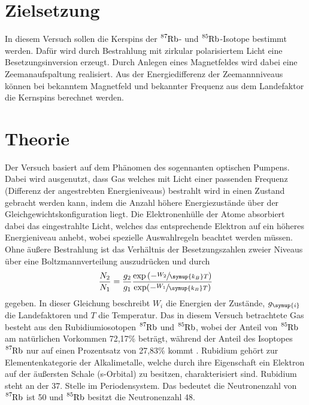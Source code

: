 \section{Zielsetzung}
\label{sec:Zielsetzung}
In diesem Versuch sollen die Kerspins der $\ce{^87Rb}$- und $\ce{^85Rb}$-Isotope
bestimmt werden. Dafür wird durch Bestrahlung mit zirkular polarisiertem Licht 
eine Besetzungsinversion erzeugt. Durch Anlegen eines Magnetfeldes wird dabei eine 
Zeemanaufspaltung realisiert. Aus der Energiedifferenz der Zeemannniveaus können bei 
bekanntem Magnetfeld und bekannter Frequenz aus dem Landefaktor die Kernspins
berechnet werden. 

\section{Theorie}
\label{sec:Theorie}

Der Versuch basiert auf dem Phänomen des sogennanten optischen Pumpens. 
Dabei wird ausgenutzt, dass Gas welches mit Licht einer passenden Frequenz 
(Differenz der angestrebten Energieniveaus) bestrahlt wird in einen Zustand 
gebracht werden kann, indem die Anzahl höhere Energiezustände über der 
Gleichgewichtskonfiguration liegt. Die Elektronenhülle der Atome 
absorbiert dabei das eingestrahlte Licht, welches das entsprechende Elektron 
auf ein höheres Energieniveau anhebt, wobei spezielle Auswahlregeln beachtet 
werden müssen.
Ohne äußere Bestrahlung ist das Verhältnis der Besetzungszahlen zweier Niveaus 
über eine Boltzmannverteilung auszudrücken und durch
\begin{equation}
    \frac{N_2}{N_1}=\frac{g_2}{g_1}\frac{\exp\left(-\sfrac{W_2}{\symup{k_B}T}\right)}{\exp(-\sfrac{W_1}{\symup{k_B}T})}
    \label{eq1}
\end{equation}
gegeben. In dieser Gleichung beschreibt $W_i$ die Energien der Zustände, 
$g_{\symup{i}}$ die Landefaktoren und $T$ die Temperatur.
Das in diesem Versuch betrachtete Gas besteht aus den Rubidiumiosotopen 
$\ce{^87Rb}$ und $\ce{^85Rb}$, wobei der Anteil von $\ce{^85Rb}$ am natürlichen 
Vorkommen 72,17\% beträgt, während der Anteil des Isoptopes $\ce{^87Rb}$
nur auf einen Prozentsatz  von 27,83\% kommt \cite{RbVorkommen}.
Rubidium gehört zur Elementenkategorie der Alkalimetalle, welche durch ihre 
Eigenschaft ein Elektron auf der äußersten Schale (s-Orbital) zu besitzen, 
charakterisiert sind.
Rubidium steht an der 37. Stelle im Periodensystem. Das bedeutet die 
Neutronenzahl von $\ce{^87Rb}$ ist 50 und $\ce{^85Rb}$ besitzt die Neutronenzahl 48.

